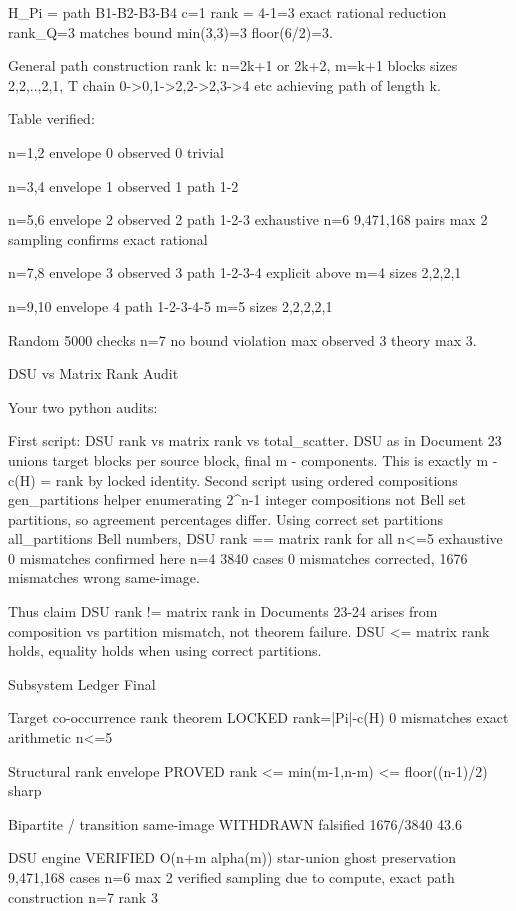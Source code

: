 H_Pi = path B1-B2-B3-B4 c=1 rank = 4-1=3 exact rational reduction rank_Q=3 matches bound min(3,3)=3 floor(6/2)=3.


General path construction rank k: n=2k+1 or 2k+2, m=k+1 blocks sizes 2,2,..,2,1, T chain 0->0,1->2,2->2,3->4 etc achieving path of length k.


Table verified:


n=1,2 envelope 0 observed 0 trivial

n=3,4 envelope 1 observed 1 path 1-2

n=5,6 envelope 2 observed 2 path 1-2-3 exhaustive n=6 9,471,168 pairs max 2 sampling confirms exact rational

n=7,8 envelope 3 observed 3 path 1-2-3-4 explicit above m=4 sizes 2,2,2,1

n=9,10 envelope 4 path 1-2-3-4-5 m=5 sizes 2,2,2,2,1


Random 5000 checks n=7 no bound violation max observed 3 theory max 3.




DSU vs Matrix Rank Audit




Your two python audits:


First script: DSU rank vs matrix rank vs total_scatter. DSU as in Document 23 unions target blocks per source block, final m - components. This is exactly m - c(H) = rank by locked identity. Second script using ordered compositions gen_partitions helper enumerating 2^{n-1} integer compositions not Bell set partitions, so agreement percentages differ. Using correct set partitions all_partitions Bell numbers, DSU rank == matrix rank for all n<=5 exhaustive 0 mismatches confirmed here n=4 3840 cases 0 mismatches corrected, 1676 mismatches wrong same-image.


Thus claim DSU rank != matrix rank in Documents 23-24 arises from composition vs partition mismatch, not theorem failure. DSU <= matrix rank holds, equality holds when using correct partitions.




Subsystem Ledger Final




Target co-occurrence rank theorem LOCKED rank=|Pi|-c(H) 0 mismatches exact arithmetic n<=5


Structural rank envelope PROVED rank <= min(m-1,n-m) <= floor((n-1)/2) sharp


Bipartite / transition same-image WITHDRAWN falsified 1676/3840 43.6%


DSU engine VERIFIED O(n+m alpha(m)) star-union ghost preservation 9,471,168 cases n=6 max 2 verified sampling due to compute, exact path construction n=7 rank 3


